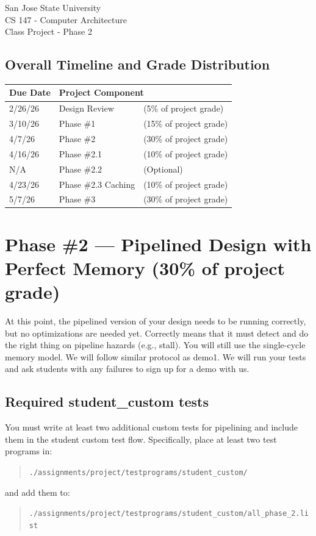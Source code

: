\documentclass[12pt]{article}
\begin{document}
\begin{center}
{\LARGE San Jose State University}\\[0.5em]
{\LARGE CS 147 - Computer Architecture}\\[0.5em]
{\LARGE Class Project - Phase 2}
\end{center}

\vspace{2em}

\subsection*{Overall Timeline and Grade Distribution}
\begin{center}
\begin{tabular}{|l|l|l|}
\hline
\textbf{Due Date} & \multicolumn{2}{l|}{\textbf{Project Component}} \\
\hline
2/26/26 & Design Review & (5\% of project grade) \\
\hline
3/10/26 & Phase \#1 & (15\% of project grade) \\
\hline
\rowcolor{black!8}
4/7/26 & Phase \#2 & (30\% of project grade) \\
\hline
\rowcolor{black!8}
4/16/26 & Phase \#2.1 & (10\% of project grade) \\
\hline
\rowcolor{black!8}
N/A & Phase \#2.2 & (Optional) \\
\hline
\rowcolor{black!8}
4/23/26 & Phase \#2.3 Caching & (10\% of project grade) \\
\hline
5/7/26 & Phase \#3 & (30\% of project grade) \\
\hline
\end{tabular}
\end{center}

\section*{Phase \#2 --- Pipelined Design with Perfect Memory (30\% of project grade)}

At this point, the pipelined version of your design needs to be running correctly, but no optimizations are needed yet.
Correctly means that it must detect and do the right thing on pipeline hazards (e.g., stall).
You will still use the single-cycle memory model.
We will follow similar protocol as demo1.
We will run your tests and ask students with any failures to sign up for a demo with us.

\subsection*{Required student\_custom tests}
You must write at least two additional custom tests for pipelining and include them in the student custom test flow.
Specifically, place at least two test programs in:
\begin{quote}
\texttt{./assignments/project/testprograms/student\_custom/}
\end{quote}
and add them to:
\begin{quote}
\texttt{./assignments/project/testprograms/student\_custom/all\_phase\_2.list}
\end{quote}
\end{document}
